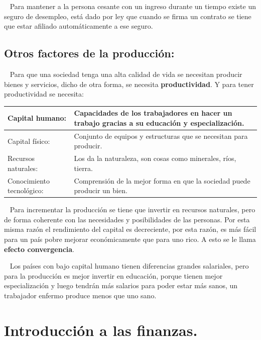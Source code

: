 \documentclass[
  letterpaper,
  DIV=11,
  numbers=noendperiod]{scrreport}
\begin{document}
~ Para mantener a la persona cesante con un ingreso durante un tiempo
existe un seguro de desempleo, está dado por ley que cuando se firma un
contrato se tiene que estar afiliado automáticamente a ese seguro.

\hypertarget{otros-factores-de-la-producciuxf3n}{%
\section{Otros factores de la
producción:}\label{otros-factores-de-la-producciuxf3n}}

~ Para que una sociedad tenga una alta calidad de vida se necesitan
producir bienes y servicios, dicho de otra forma, se necesita
\textbf{productividad}. Y para tener productividad se necesita:

\begin{table}[H]
    \centering
    \begin{tabular}{|p{30mm}|p{90mm}|}
        \hline
        Capital humano: & Capacidades de los trabajadores en hacer un trabajo gracias a su educación y especialización. \\ \hline
        Capital físico: & Conjunto de equipos y estructuras que se necesitan para producir. \\ \hline
        Recursos naturales: & Los da la naturaleza, son cosas como minerales, ríos, tierra. \\ \hline
        Conocimiento tecnológico: & Comprensión de la mejor forma en que la sociedad puede producir un bien. \\ \hline
    \end{tabular}
    
\end{table}

~ Para incrementar la producción se tiene que invertir en recursos
naturales, pero de forma coherente con las necesidades y posibilidades
de las personas. Por esta misma razón el rendimiento del capital es
decreciente, por esta razón, es más fácil para un país pobre mejorar
económicamente que para uno rico. A esto se le llama \textbf{efecto
convergencia}.

~ Los países con bajo capital humano tienen diferencias grandes
salariales, pero para la producción es mejor invertir en educación,
porque tienen mejor especialización y luego tendrán más salarios para
poder estar más sanos, un trabajador enfermo produce menos que uno sano.


\hypertarget{introducciuxf3n-a-las-finanzas.}{%
\chapter{Introducción a las
finanzas.}\label{introducciuxf3n-a-las-finanzas.}}
\end{document}
